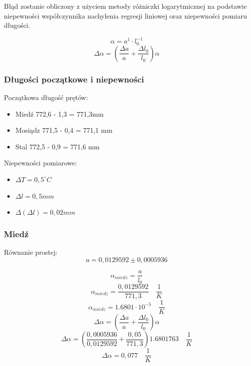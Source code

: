 \documentclass[a4paper, 11pt]{article}
\begin{document}
Błąd zostanie obliczony z użyciem  metody różniczki logarytmicznej na podstawie
niepewności współczynnika nachylenia regresji liniowej oraz niepewności pomiaru długości.

\[
	\alpha = a^1 \cdot l_0^{-1}
\]
\[
	\Delta \alpha = \left( \frac{\Delta a}{a} + \frac{\Delta l_0}{l_0} \right) \alpha
\]

\subsubsection{Długości początkowe i niepewności}

\begin{multicols}{2}

	Początkowa długość prętów:
	\begin{itemize}
		\item Miedź 772,6 - 1,3 = 771,3mm
		\item Mosiądz 771,5 - 0,4 = 771,1 mm
		\item Stal 772,5 - 0,9 = 771,6 mm
	\end{itemize}

	\columnbreak

	Niepewności pomiarowe:
	\begin{itemize}
		\item $ \Delta T = 0,5^{\circ}C$
		\item $ \Delta l = 0,5mm $
		\item $ \Delta(\Delta l) = 0,02mm  $
	\end{itemize}

\end{multicols}

\subsubsection{Miedź}\label{sub:miedz} %
Równanie prostej:
\[
	a = 0,0129592 \pm 0,0005936
\]
\begin{multicols}{2}
	\[
		\alpha_{miedz} = \frac{a}{l_0}
	\]
	\[
		\alpha_{miedz} = \frac{0,0129592}{771,3} \quad \frac{1}{K}
	\]
	\[
		\alpha_{miedz} = 1.6801 \cdot 10^{-5} \quad \frac{1}{K}
	\]
	\columnbreak
	\[
		\Delta \alpha = \left( \frac{\Delta a}{a} + \frac{\Delta l_0}{l_0} \right) \alpha
	\]
	\[
		\Delta \alpha = \left( \frac{0,0005936}{0,0129592} + \frac{0,05}{771,3} \right) 1.6801763 \quad \frac{1}{K}
	\]
	\[
		\Delta \alpha = 0,077 \quad \frac{1}{K}
	\]
\end{multicols}
\end{document}
